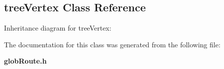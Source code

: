 \subsection{tree\-Vertex  Class Reference}
\label{treeVertex}
Inheritance diagram for tree\-Vertex:\begin{figure}[H]
\begin{center}
\leavevmode
\setlength{\epsfysize}{2cm}
\end{center}
\end{figure}


The documentation for this class was generated from the following file:\begin{CompactItemize}
\item 
{\bf glob\-Route.h}\end{CompactItemize}

